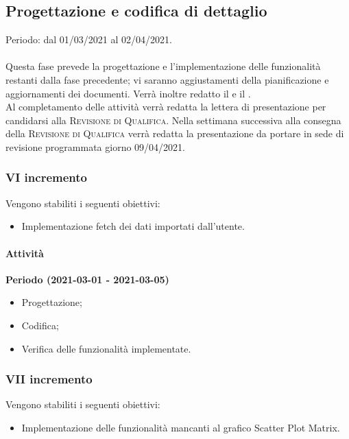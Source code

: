 \documentclass[../piano_di_progetto.tex]{subfiles}
\begin{document}
\subsection{Progettazione e codifica di dettaglio}%
\label{sub:prog_dett}
Periodo: dal 01/03/2021 al 02/04/2021.\\ \\
Questa fase prevede la progettazione e l'implementazione delle funzionalità restanti dalla fase precedente; vi saranno aggiustamenti della pianificazione e aggiornamenti dei documenti. Verrà inoltre redatto il \textsc{} e il \textsc{}. \\ %
Al completamento delle attività verrà redatta la lettera di presentazione per candidarsi alla \textsc{Revisione di Qualifica}. 
Nella settimana successiva alla consegna della \textsc{Revisione di Qualifica} verrà redatta la presentazione da portare in sede di revisione programmata giorno 09/04/2021. 

\subsubsection{VI incremento}
Vengono stabiliti i seguenti obiettivi:
\begin{itemize}
    \item Implementazione fetch dei dati importati dall'utente.
\end{itemize}
\paragraph{Attività}
\noindent\textbf{Periodo (2021-03-01 - 2021-03-05)}
\begin{itemize}
    \item Progettazione;
    \item Codifica;
    \item Verifica delle funzionalità implementate.
\end{itemize}


\subsubsection{VII incremento}
Vengono stabiliti i seguenti obiettivi:
\begin{itemize}
    \item Implementazione delle funzionalità mancanti al grafico Scatter Plot Matrix.
\end{itemize}
\end{document}
